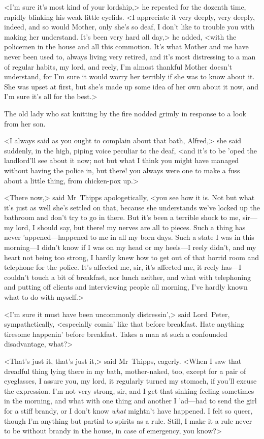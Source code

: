 <I'm sure it's most kind of your lordship,> he repeated for the dozenth time, rapidly blinking his weak little eyelids. <I appreciate it very deeply, very deeply, indeed, and so would Mother, only she's so deaf, I don't like to trouble you with making her understand. It's been very hard all day,> he added, <with the policemen in the house and all this commotion. It's what Mother and me have never been used to, always living very retired, and it's most distressing to a man of regular habits, my lord, and reely, I'm almost thankful Mother doesn't understand, for I'm sure it would worry her terribly if she was to know about it. She was upset at first, but she's made up some idea of her own about it now, and I'm sure it's all for the best.>

The old lady who sat knitting by the fire nodded grimly in response to a look from her son.

<I always said as you ought to complain about that bath, Alfred,> she said suddenly, in the high, piping voice peculiar to the deaf, <and it's to be 'oped the landlord'll see about it now; not but what I think you might have managed without having the police in, but there! you always were one to make a fuss about a little thing, from chicken-pox up.>

<There now,> said Mr~Thipps apologetically, <you see how it is. Not but what it's just as well she's settled on that, because she understands we've locked up the bathroom and don't try to go in there. But it's been a terrible shock to me, sir—my lord, I should say, but there! my nerves are all to pieces. Such a thing has never 'appened—happened to me in all my born days. Such a state I was in this morning—I didn't know if I was on my head or my heels—I reely didn't, and my heart not being too strong, I hardly knew how to get out of that horrid room and telephone for the police. It's affected me, sir, it's affected me, it reely has—I couldn't touch a bit of breakfast, nor lunch neither, and what with telephoning and putting off clients and interviewing people all morning, I've hardly known what to do with myself.>

<I'm sure it must have been uncommonly distressin',> said Lord~Peter, sympathetically, <especially comin' like that before breakfast. Hate anything tiresome happenin' before breakfast. Takes a man at such a confounded disadvantage, what?>

<That's just it, that's just it,> said Mr~Thipps, eagerly. <When I saw that dreadful thing lying there in my bath, mother-naked, too, except for a pair of eyeglasses, I assure you, my lord, it regularly turned my stomach, if you'll excuse the expression. I'm not very strong, sir, and I get that sinking feeling sometimes in the morning, and what with one thing and another I 'ad—had to send the girl for a stiff brandy, or I don't know \emph{what} mightn't have happened. I felt so queer, though I'm anything but partial to spirits as a rule. Still, I make it a rule never to be without brandy in the house, in case of emergency, you know?>

